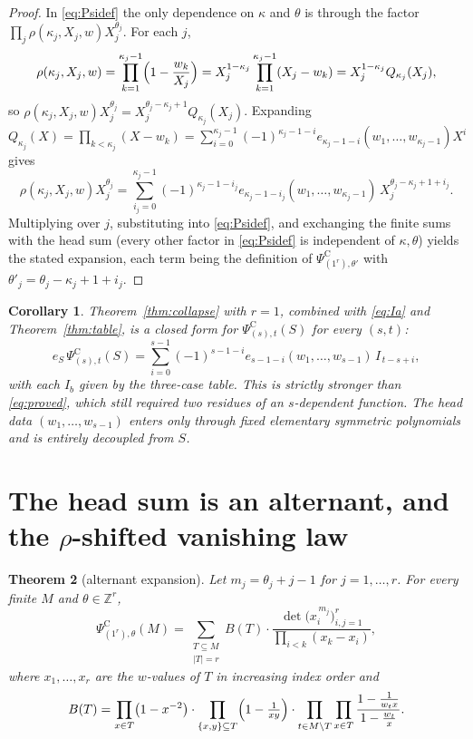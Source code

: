 \documentclass[11pt]{article}
\newtheorem{theorem}{Theorem}
\newtheorem{corollary}[theorem]{Corollary}
\theoremstyle{definition}
\theoremstyle{remark}
\newcommand{\PsiC}{\Psi^{\mathrm{C}}}
\begin{document}
\begin{proof}
In \eqref{eq:Psidef} the only dependence on $\kappa$ and $\theta$ is through the factor
$\prod_j\rho(\kappa_j,X_j,w)X_j^{\theta_j}$. For each $j$,
\[
  \rho(\kappa_j,X_j,w)=\prod_{k=1}^{\kappa_j-1}\Bigl(1-\frac{w_k}{X_j}\Bigr)
  =X_j^{1-\kappa_j}\prod_{k=1}^{\kappa_j-1}(X_j-w_k)
  =X_j^{1-\kappa_j}Q_{\kappa_j}(X_j),
\]
so $\rho(\kappa_j,X_j,w)X_j^{\theta_j}=X_j^{\theta_j-\kappa_j+1}Q_{\kappa_j}(X_j)$.
Expanding $Q_{\kappa_j}(X)=\prod_{k<\kappa_j}(X-w_k)
=\sum_{i=0}^{\kappa_j-1}(-1)^{\kappa_j-1-i}e_{\kappa_j-1-i}(w_1,\dots,w_{\kappa_j-1})X^{i}$
gives
\[
  \rho(\kappa_j,X_j,w)X_j^{\theta_j}
  =\sum_{i_j=0}^{\kappa_j-1}(-1)^{\kappa_j-1-i_j}
     e_{\kappa_j-1-i_j}(w_1,\dots,w_{\kappa_j-1})\,X_j^{\theta_j-\kappa_j+1+i_j}.
\]
Multiplying over $j$, substituting into \eqref{eq:Psidef}, and exchanging the finite sums
with the head sum (every other factor in \eqref{eq:Psidef} is independent of
$\kappa,\theta$) yields the stated expansion, each term being the definition of
$\PsiC_{(1^r),\theta'}$ with $\theta'_j=\theta_j-\kappa_j+1+i_j$.
\end{proof}

\begin{corollary}
Theorem~\ref{thm:collapse} with $r=1$, combined with \eqref{eq:Ia} and
Theorem~\ref{thm:table}, is a closed form for $\PsiC_{(s),t}(S)$ for \emph{every}
$(s,t)$:
\[
  e_S\,\PsiC_{(s),t}(S)
  =\sum_{i=0}^{s-1}(-1)^{s-1-i}e_{s-1-i}(w_1,\dots,w_{s-1})\,I_{\,t-s+i},
\]
with each $I_b$ given by the three-case table. This is strictly stronger than
\eqref{eq:proved}, which still required two residues of an $s$-dependent function. The
head data $(w_1,\dots,w_{s-1})$ enters only through fixed elementary symmetric
polynomials and is entirely decoupled from $S$.
\end{corollary}

\section{The head sum is an alternant, and the $\rho$-shifted vanishing law}

\begin{theorem}[alternant expansion]\label{thm:alt}
Let $m_j=\theta_j+j-1$ for $j=1,\dots,r$. For every finite $M$ and $\theta\in\mathbb{Z}^r$,
\[
  \PsiC_{(1^r),\theta}(M)
  =\sum_{\substack{T\subseteq M\\ |T|=r}} B(T)\cdot
    \frac{\det\bigl(x_i^{\,m_j}\bigr)_{i,j=1}^{r}}{\prod_{i<k}(x_k-x_i)},
\]
where $x_1,\dots,x_r$ are the $w$-values of $T$ in increasing index order and
\[
  B(T)=\prod_{x\in T}\bigl(1-x^{-2}\bigr)\cdot
       \prod_{\{x,y\}\subseteq T}\Bigl(1-\tfrac{1}{xy}\Bigr)\cdot
       \prod_{t\in M\setminus T}\prod_{x\in T}\frac{1-\frac{1}{w_tx}}{1-\frac{w_t}{x}} .
\]
\end{theorem}
\end{document}
